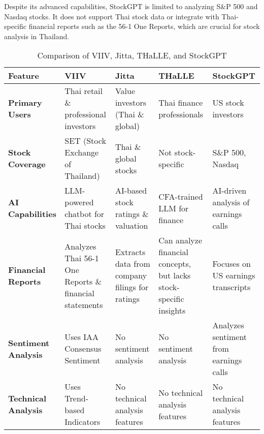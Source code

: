 Despite its advanced capabilities, StockGPT is limited to analyzing S\&P 500 and Nasdaq stocks. It does not support Thai stock data or integrate with Thai-specific financial reports such as 
the 56-1 One Reports, which are crucial for stock analysis in Thailand\cite{StockGPTWebsite}.

\begin{table}[h]
    \small
    \renewcommand{\arraystretch}{1.5}
    \caption{Comparison of VIIV, Jitta, THaLLE, and StockGPT}
    \label{tab:comparison}
    \begin{tabularx}{\textwidth}{|
        >{\raggedright\columncolor{gray!30}}X |
        >{\raggedright\arraybackslash}X|
        >{\raggedright\arraybackslash}X|
        >{\raggedright\arraybackslash}X|
        >{\raggedright\arraybackslash}X|}
        \hline
        \rowcolor{gray!30} \textbf{Feature} & \textbf{VIIV} & \textbf{Jitta} & \textbf{THaLLE} & \textbf{StockGPT} \\
        \hline
        \textbf{Primary Users} & Thai retail \& professional investors & Value investors (Thai \& global) & Thai finance professionals & US stock investors \\
        \hline
        \textbf{Stock Coverage} & \cellcolor{yellow!30}SET (Stock Exchange of Thailand) & \cellcolor{yellow!30}Thai \& global stocks & \cellcolor{yellow!30}Not stock-specific & \cellcolor{yellow!30}S\&P 500, Nasdaq \\
        \hline
        \textbf{AI Capabilities} & \cellcolor{yellow!30}LLM-powered chatbot for Thai stocks & \cellcolor{yellow!30}AI-based stock ratings \& valuation & \cellcolor{yellow!30}CFA-trained LLM for finance & \cellcolor{yellow!30}AI-driven analysis of earnings calls \\
        \hline
        \textbf{Financial Reports} & \cellcolor{yellow!30}Analyzes Thai 56-1 One Reports \& financial statements & \cellcolor{yellow!30}Extracts data from company filings for ratings & \cellcolor{yellow!30}Can analyze financial concepts, but lacks stock-specific insights & \cellcolor{yellow!30}Focuses on US earnings transcripts \\
        \hline
        \textbf{Sentiment Analysis} & Uses IAA Consensus Sentiment & No sentiment analysis & No sentiment analysis & Analyzes sentiment from earnings calls \\
        \hline
        \textbf{Technical Analysis} & Uses Trend-based Indicators & No technical analysis features & No technical analysis features & No technical analysis features \\

\end{tabularx}
\end{table}
